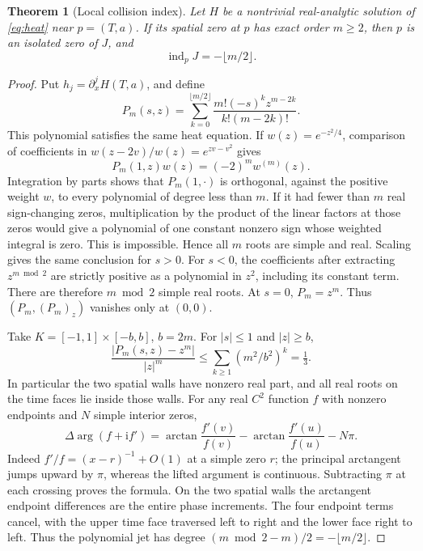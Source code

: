 \documentclass[11pt]{article}
\newtheorem{theorem}{Theorem}[section]
\theoremstyle{definition}
\newcommand{\ii}{\mathrm i}
\newcommand{\ind}{\operatorname{ind}}
\begin{document}
\begin{theorem}[Local collision index]\label{thm:index}
Let \(H\) be a nontrivial real-analytic solution of \eqref{eq:heat}
near \(p=(T,a)\). If its spatial zero at \(p\) has exact order \(m\ge2\),
then \(p\) is an isolated zero of \(J\), and
\[
                         \ind_pJ=-\lfloor m/2\rfloor .
\]
\end{theorem}
\begin{proof}
Put \(h_j=\partial_x^jH(T,a)\), and define
\[
 P_m(s,z)=\sum_{k=0}^{\lfloor m/2\rfloor}
              \frac{m!(-s)^kz^{m-2k}}{k!(m-2k)!}.
\]
This polynomial satisfies the same heat equation. If
\(w(z)=e^{-z^2/4}\), comparison of coefficients in
\(w(z-2v)/w(z)=e^{zv-v^2}\) gives
\[
 P_m(1,z)w(z)=(-2)^m w^{(m)}(z).
\]
Integration by parts shows that \(P_m(1,\cdot)\) is orthogonal, against
the positive weight \(w\), to every polynomial of degree less than \(m\).
If it had fewer than \(m\) real sign-changing zeros, multiplication by
the product of the linear factors at those zeros would give a polynomial
of one constant nonzero sign whose weighted integral is zero. This is
impossible. Hence all \(m\) roots are simple and real.
Scaling gives the same conclusion for \(s>0\).
For \(s<0\), the coefficients after extracting \(z^{m\bmod2}\) are
strictly positive as a polynomial in \(z^2\), including its constant term.
There are therefore \(m\bmod2\) simple real roots.
At \(s=0\), \(P_m=z^m\). Thus
\((P_m,(P_m)_z)\) vanishes only at \((0,0)\).

Take \(K=[-1,1]\times[-b,b]\), \(b=2m\).
For \(|s|\le1\) and \(|z|\ge b\),
\[
 \frac{|P_m(s,z)-z^m|}{|z|^m}
 \le\sum_{k\ge1}(m^2/b^2)^k=\tfrac13 .
\]
In particular the two spatial walls have nonzero real part, and all
real roots on the time faces lie inside those walls.
For any real \(C^2\) function \(f\) with nonzero endpoints and \(N\)
simple interior zeros,
\begin{equation}
 \Delta\arg(f+\ii f')
 =\arctan\frac{f'(v)}{f(v)}
  -\arctan\frac{f'(u)}{f(u)}-N\pi.               \label{eq:phasezeros}
\end{equation}
Indeed \(f'/f=(x-r)^{-1}+O(1)\) at a simple zero \(r\);
the principal arctangent jumps upward by \(\pi\), whereas the lifted
argument is continuous. Subtracting \(\pi\) at each crossing proves the
formula. On the two spatial walls the arctangent endpoint differences
are the entire phase increments. The four endpoint terms cancel,
with the upper time face traversed left to right and the lower face
right to left. Thus the polynomial jet has degree
\((m\bmod2-m)/2=-\lfloor m/2\rfloor\).


\end{proof}
\end{document}
